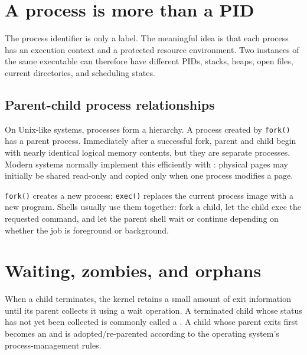 \section{A process is more than a PID}
The process identifier is only a label. The meaningful idea is that each process has an execution context and a protected resource environment. Two instances of the same executable can therefore have different PIDs, stacks, heaps, open files, current directories, and scheduling states.

\subsection{Parent-child process relationships}
On Unix-like systems, processes form a hierarchy. A process created by \texttt{fork()} has a parent process. Immediately after a successful fork, parent and child begin with nearly identical logical memory contents, but they are separate processes. Modern systems normally implement this efficiently with : physical pages may initially be shared read-only and copied only when one process modifies a page.

\begin{keyidea}
\texttt{fork()} creates a new process; \texttt{exec()} replaces the current process image with a new program. Shells usually use them together: fork a child, let the child exec the requested command, and let the parent shell wait or continue depending on whether the job is foreground or background.
\end{keyidea}

\begin{mlfigure}
\end{mlfigure}

\section{Waiting, zombies, and orphans}
When a child terminates, the kernel retains a small amount of exit information until its parent collects it using a wait operation. A terminated child whose status has not yet been collected is commonly called a . A child whose parent exits first becomes an  and is adopted/re-parented according to the operating system's process-management rules.

